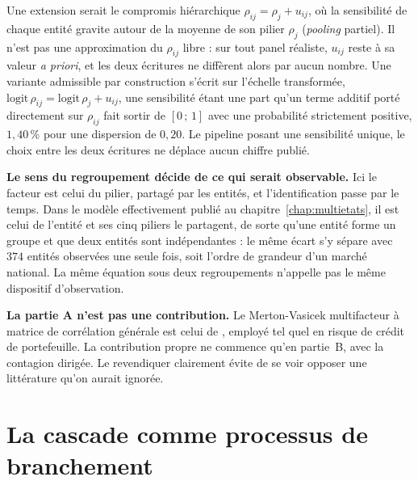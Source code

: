 Une extension serait le compromis hiérarchique $\rho_{ij}=\rho_j+u_{ij}$, où la sensibilité de chaque
entité gravite autour de la moyenne de son pilier $\rho_j$ (\emph{pooling} partiel). Il n'est pas
une approximation du $\rho_{ij}$ libre : sur tout panel réaliste, $u_{ij}$ reste à sa valeur
\emph{a priori}, et les deux écritures ne diffèrent alors par aucun nombre. Une variante
admissible par construction s'écrit sur l'échelle transformée,
$\mathrm{logit}\,\rho_{ij}=\mathrm{logit}\,\rho_j+u_{ij}$, une sensibilité étant une part qu'un
terme additif porté directement sur $\rho_{ij}$ fait sortir de $[0\,;\,1]$ avec une probabilité
strictement positive, $1{,}40\,\%$ pour une dispersion de $0{,}20$. Le pipeline posant une
sensibilité unique, le choix entre les deux écritures ne déplace aucun chiffre publié.

\begin{attention}
\textbf{Le sens du regroupement décide de ce qui serait observable.} Ici le facteur est celui du
pilier, partagé par les entités, et l'identification passe par le temps. Dans le modèle
effectivement publié au chapitre~\ref{chap:multietats}, il est celui de l'entité et ses cinq
piliers le partagent, de sorte qu'une entité forme un groupe et que deux entités sont
indépendantes : le même écart s'y sépare avec $374$ entités observées une seule fois, soit
l'ordre de grandeur d'un marché national. La même équation sous deux regroupements n'appelle pas le même
dispositif d'observation.
\end{attention}

\begin{cle}
\textbf{La partie A n'est pas une contribution.} Le Merton-Vasicek multifacteur à
matrice de corrélation générale est celui de \citet{Li2000}, employé tel quel en risque de
crédit de portefeuille. La contribution propre ne commence qu'en partie~B, avec
la contagion dirigée. Le revendiquer clairement évite de se voir opposer une
littérature qu'on aurait ignorée.
\end{cle}


\section{La cascade comme processus de branchement}

